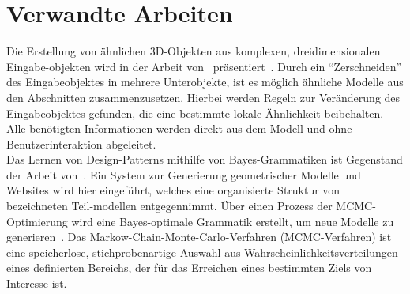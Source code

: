 \section{Verwandte Arbeiten}
Die Erstellung von ähnlichen 3D-Objekten aus komplexen, dreidimensionalen Eingabe-objekten wird in der Arbeit von~\citeauthor{bokeloh_2010}
präsentiert~\cite{bokeloh_2010}.
Durch ein "`Zerschneiden"' des Eingabeobjektes in mehrere Unterobjekte, ist es möglich ähnliche Modelle aus den
Abschnitten zusammenzusetzen.
Hierbei werden Regeln zur Veränderung des Eingabeobjektes gefunden, die eine bestimmte lokale Ähnlichkeit beibehalten.
Alle benötigten Informationen werden direkt aus dem Modell und ohne Benutzerinteraktion abgeleitet.\\
Das Lernen von Design-Patterns mithilfe von Bayes-Grammatiken ist Gegenstand der Arbeit von~\citeauthor{talton_2012}.
Ein System zur Generierung geometrischer Modelle und\\Websites wird hier eingeführt, welches eine organisierte
Struktur von bezeichneten Teil-modellen entgegennimmt.
Über einen Prozess der MCMC-Optimierung wird eine Bayes-optimale Grammatik erstellt, um neue Modelle zu generieren~\cite{talton_2012}.
Das Markow-Chain-Monte-Carlo-Verfahren (MCMC-Verfahren) ist eine speicherlose, stichprobenartige Auswahl aus
Wahrscheinlichkeitsverteilungen eines definierten Bereichs, der für das Erreichen eines bestimmten Ziels von
Interesse ist.

\newpage


